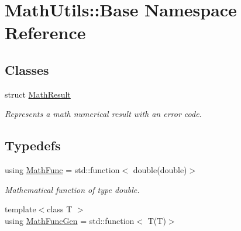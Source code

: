 \hypertarget{namespaceMathUtils_1_1Base}{\section{Math\-Utils\-:\-:Base Namespace Reference}
\label{namespaceMathUtils_1_1Base}
}
\subsection*{Classes}
\begin{DoxyCompactItemize}
\item 
struct \hyperlink{structMathUtils_1_1Base_1_1MathResult}{Math\-Result}
\begin{DoxyCompactList}\small\item\em Represents a math numerical result with an error code. \end{DoxyCompactList}\end{DoxyCompactItemize}
\subsection*{Typedefs}
\begin{DoxyCompactItemize}
\item 
using \hyperlink{namespaceMathUtils_1_1Base_a655889e83691f7f82ec161684afa2c1f}{Math\-Func} = std\-::function$<$ double(double)$>$
\begin{DoxyCompactList}\small\item\em Mathematical function of type double. \end{DoxyCompactList}\item 
{\footnotesize template$<$class T $>$ }\\using \hyperlink{namespaceMathUtils_1_1Base_a99755ccc9707a5ae2e93b4d9fbeb4391}{Math\-Func\-Gen} = std\-::function$<$ T(T)$>$
\end{DoxyCompactItemize}
